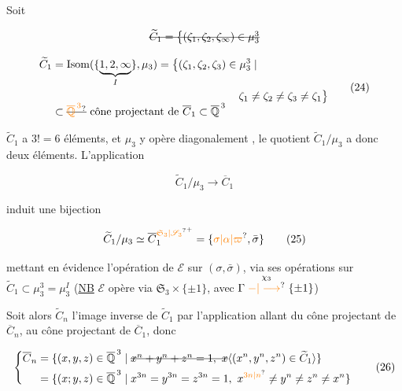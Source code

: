 

Soit

\[
\deleted{\widetilde C_1=\bigl\{(\zeta_1,\zeta_2,\zeta_\infty)\in\mu_3^3}
\]

\[
\begin{aligned}
\widetilde C_1&=\operatorname{Isom}(\{\underbrace{1,2,\infty}_{I}\},\mu_3)
=\bigl\{(\zeta_1,\zeta_2,\zeta_3)\in\mu_3^3\mid\\
&\hspace{17em}\zeta_1\ne\zeta_2\ne\zeta_3\ne\zeta_1\bigr\}\\[-1ex]
&\subset\deleted{\unsure{\overline{\mathbb Q}^{\,3}}}\ \text{cône projectant de }\overline C_1\subset\overline{\mathbb Q}^{\,3}
\end{aligned}\tag*{(24)}
\]

$\widetilde C_1$ a $3!=6$ éléments, et $\mu_3$ y opère diagonalement  , le quotient $\widetilde C_1/\mu_3$ a donc deux éléments. L'application

\[
\widetilde C_1/\mu_3\longrightarrow\overline C_1
\]


induit une bijection

\[
\widetilde C_1/\mu_3\simeq\overline C_1^{\unsure{\mathfrak S_3|\mathscr S_3}^{+}}
=\{\unsure{\sigma|\alpha|\varpi},\bar\sigma\}
\tag*{(25)}
\]

mettant en évidence l'opération de $\mathcal E$ sur $(\sigma,\bar\sigma)$, via ses opérations sur $\widetilde C_1\subset\mu_3^3=\mu_3^I$ (\uline{NB} $\mathcal E$ opère via $\mathfrak S_3\times\{\pm1\}$, avec $\Gamma\mathrel{\overset{\chi_3}{\unsure{-|\longrightarrow}}}\{\pm1\}$)

Soit alors $\widetilde C_n$ l'image inverse de $\widetilde C_1$ par l'application allant du cône projectant de $\overline C_n$, au cône projectant de $\overline C_1$, donc 

\[
\left\{\begin{aligned}
\overline C_n&=\{(x,y,z)\in\overline{\mathbb Q}^{\,3}\mid
\deleted{x^n+y^n+z^n=1,\ x}\inserted{(x^n,y^n,z^n)\in\widetilde C_1}\}\\
&=\{(x;y,z)\in\overline{\mathbb Q}^{\,3}\mid
x^{3n}=y^{3n}=z^{3n}=1,\ x^{\unsure{3n|n}}\ne y^n\ne z^n\ne x^n\}
\end{aligned}\right.\tag*{(26)}
\]

